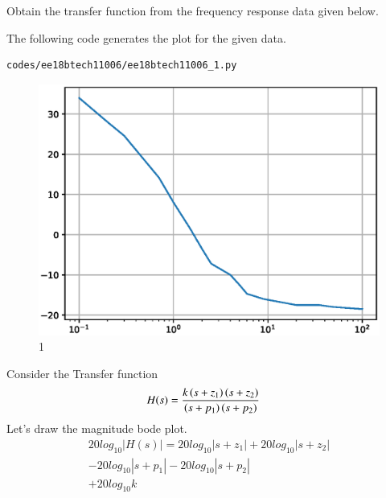 
Obtain the transfer function from the frequency response data given below.
\begin{table}[!ht]
\centering

\caption{}
\label{table:ee18btech11006}
\end{table}
\solution 
The following code generates the plot for the given data.
\begin{lstlisting}
codes/ee18btech11006/ee18btech11006_1.py
\end{lstlisting}
\begin{figure}[!ht]
\centering
\includegraphics[width=\columnwidth]{./figs/ee18btech11006/ee18btech11006_1.eps}
\caption{1}
\label{fig:ee18btech11006_1}
\end{figure}
Consider the Transfer function
\begin{align}
H(s) &= \frac{k\left(s+z_{1}\right)\left(s+z_{2}\right)}{\left(s+p_{1}\right)\left(s+p_{2}\right)} 
\end{align}
Let's draw the magnitude bode plot.
\begin{multline}
20log_{10}|H(s)| = 20log_{10}|s+z_{1}|+20log_{10}|s+z_{2}|\\
-20log_{10}|s+p_{1}|-20log_{10}|s+p_{2}|\\
+20log_{10}k
\end{multline}


